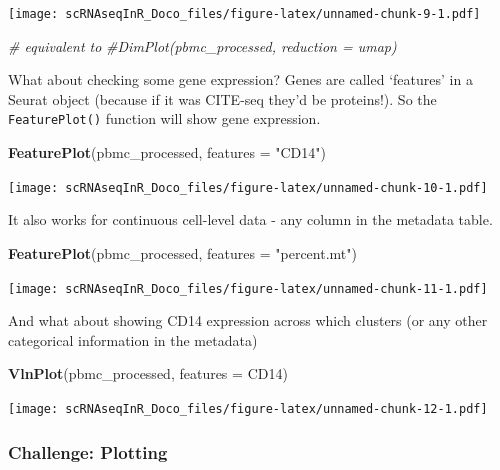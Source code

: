 \documentclass[
]{book}
\newenvironment{Shaded}{\begin{snugshade}}{\end{snugshade}}
\newcommand{\AttributeTok}[1]{\textcolor[rgb]{0.13,0.29,0.53}{#1}}
\newcommand{\CommentTok}[1]{\textcolor[rgb]{0.56,0.35,0.01}{\textit{#1}}}
\newcommand{\FunctionTok}[1]{\textcolor[rgb]{0.13,0.29,0.53}{\textbf{#1}}}
\newcommand{\NormalTok}[1]{#1}
\newcommand{\StringTok}[1]{\textcolor[rgb]{0.31,0.60,0.02}{#1}}
\begin{document}
\texttt{[image: scRNAseqInR\_Doco\_files/figure-latex/unnamed-chunk-9-1.pdf]}

\begin{Shaded}
\begin{Highlighting}[]
\CommentTok{\# equivalent to}
\CommentTok{\#DimPlot(pbmc\_processed, reduction = \textquotesingle{}umap\textquotesingle{})}
\end{Highlighting}
\end{Shaded}

What about checking some gene expression? Genes are called `features' in a Seurat object (because if it was CITE-seq they'd be proteins!). So the \texttt{FeaturePlot()} function will show gene expression.

\begin{Shaded}
\begin{Highlighting}[]
\FunctionTok{FeaturePlot}\NormalTok{(pbmc\_processed, }\AttributeTok{features =}  \StringTok{"CD14"}\NormalTok{)}
\end{Highlighting}
\end{Shaded}

\texttt{[image: scRNAseqInR\_Doco\_files/figure-latex/unnamed-chunk-10-1.pdf]}

It also works for continuous cell-level data - any column in the metadata table.

\begin{Shaded}
\begin{Highlighting}[]
\FunctionTok{FeaturePlot}\NormalTok{(pbmc\_processed, }\AttributeTok{features =}  \StringTok{"percent.mt"}\NormalTok{)}
\end{Highlighting}
\end{Shaded}

\texttt{[image: scRNAseqInR\_Doco\_files/figure-latex/unnamed-chunk-11-1.pdf]}

And what about showing CD14 expression across which clusters (or any other categorical information in the metadata)

\begin{Shaded}
\begin{Highlighting}[]
\FunctionTok{VlnPlot}\NormalTok{(pbmc\_processed, }\AttributeTok{features =} \StringTok{\textquotesingle{}CD14\textquotesingle{}}\NormalTok{)}
\end{Highlighting}
\end{Shaded}

\texttt{[image: scRNAseqInR\_Doco\_files/figure-latex/unnamed-chunk-12-1.pdf]}

\hypertarget{challenge-plotting}{%
\subsubsection*{Challenge: Plotting}\label{challenge-plotting}}
\end{document}
